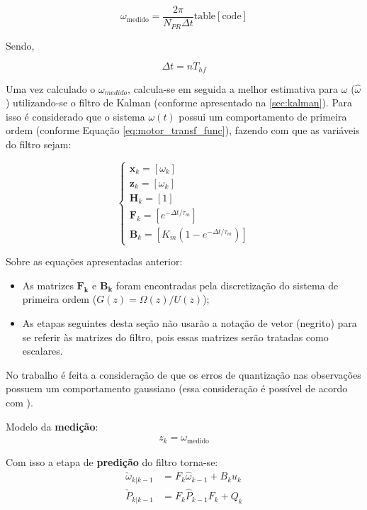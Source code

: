 \begin{equation}
    \omega_{\text{medido}} = \frac{2\pi}{N_{PR}\Delta{t}}\text{table}[\text{code}]
\end{equation}

Sendo,

\begin{equation*}
    \Delta{t} = nT_{hf}
\end{equation*}

Uma vez calculado o $\omega_{medido}$, calcula-se em 
seguida a melhor estimativa para $\omega$ ($\hat{\omega}$) 
utilizando-se o filtro de Kalman (conforme apresentado na \autoref{sec:kalman}). 
Para isso é considerado que o sistema $\omega(t)$ possui um comportamento de primeira ordem 
(conforme Equação \ref{eq:motor_transf_func}), fazendo com que as variáveis do filtro sejam:

\begin{equation*}
\begin{cases}
    \bm{x}_k = \left[ \omega_k \right]\\
    \bm{z}_k = [\omega_k]\\
    \bm{H}_k = [1]\\
    \bm{F}_k = [e^{-\Delta{t}/\tau_{m}}]\\
    \bm{B}_k = [K_{m}(1 - e^{-\Delta{t}/\tau_{m}})]
\end{cases}
\end{equation*}

Sobre as equações apresentadas anterior: 
\begin{itemize}
    \item As matrizes $\bm{F_k}$ e $\bm{B_k}$ foram encontradas pela discretização do sistema de primeira ordem ($G(z) = \Omega(z)/U(z)$);
    \item As etapas seguintes desta seção não usarão a notação de vetor (negrito) para se referir às matrizes do filtro, pois essas matrizes serão tratadas como escalares.
\end{itemize}

No trabalho é feita a consideração de que os erros de quantização nas observações possuem um comportamento gaussiano (essa consideração é possível de acordo com \cite{quantization_error_is_a_gaussian}).

Modelo da \textbf{medição}:
\begin{align*}
z_k = \omega_{\text{medido}}
\end{align*}

Com isso a etapa de \textbf{predição} do filtro torna-se:
\begin{align*}
    \check{\omega}_{k|k-1} &= F_k \hat{\omega}_{k-1} + B_{k} u_{k}\\
    \check{P}_{k|k-1} &= F_{k}\hat{P}_{k-1}F_k + Q_k
\end{align*}

